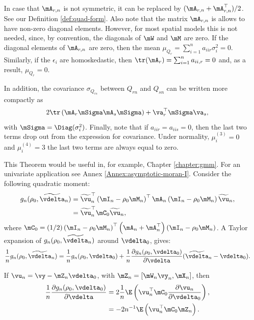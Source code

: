 \documentclass[english,12pt]{book}\usepackage[]{graphicx}\usepackage[]{xcolor}
\begin{document}
In case that $\mA_{r,n}$ is not symmetric, it can be replaced by $(\mA_{r, n}+ \mA_{r, n}^\top)/2$. See our Definition \ref{def:quad-form}. Also note that the matrix $\mA_{r,n}$ is allows to have non-zero diagonal elements. However, for most spatial models this is not needed, since, by convention, the diagonals of $\mW$ and $\mM$ are zero. If the diagonal elements of $\mA_{r,n}$ are zero, then the mean $\mu_{Q_r}  = \sum_{i = 1}^na_{iir}\sigma_i^2 = 0$. Similarly, if the $\epsilon_i$ are homoskedastic, then $\tr(\mA_r) = \sum_{i = 1}^n a_{ii,r} = 0$ and, as a result, $\mu_{Q_r} = 0$. 

In addition, the covariance $\sigma_{Q_{rs}}$ between $Q_{rn}$ and $Q_{sn}$ can be written more compactly as
\begin{equation*}
2\tr\left(\mA_r\mSigma\mA_s\mSigma\right) + \va_r^\top\mSigma\va_s,
\end{equation*}
%
with $\mSigma = \Diag(\sigma_i^2)$. Finally, note that if $a_{iir} = a_{iis} = 0$, then the last two terms drop out from the expression for covariance. Under normality, $\mu_i^{(3)} = 0$ and $\mu_{i}^{(4)} = 3$ the last two terms are always equal to zero. 

This Theorem would be useful in, for example, Chapter \ref{chapter:gmm}. For an univariate application see Annex \ref{Annex:asymptotic-moran-I}. Consider the following quadratic moment:
\begin{equation*}
\begin{aligned}
g_n(\rho_0, \widetilde{\vdelta}_n) & = \widetilde{\vu}_n^\top\left(\mI_n - \rho_0\mM_n\right)^\top\mA_n\left(\mI_n - \rho_0\mM_n\right)\widetilde{\vu}_n, \\
                                  & = \widetilde{\vu}_n^\top\mC_0\widetilde{\vu}_n, 
\end{aligned}
\end{equation*}
%
where $\mC_0 = (1 / 2)\left(\mI_n - \rho_0\mM_n\right)^\top\left(\mA_n + \mA_n^\top\right)\left(\mI_n - \rho_0\mM_n\right)$. A Taylor expansion of $g_n(\rho_0, \widetilde{\vdelta}_n)$ around $\vdelta_0$, gives:
\begin{equation*}
  \frac{1}{n}g_n(\rho_0, \widetilde{\vdelta}_n) = \frac{1}{n}g_n(\rho_0, \vdelta_0) + \frac{1}{n}\frac{\partial g_n(\rho_0, \vdelta_0)}{\partial \vdelta}(\widetilde{\vdelta}_n - \vdelta_0).
\end{equation*}

If $\vu_n = \vy - \mZ_n\vdelta_0$, with $\mZ_n = \left[\mW_n\vy_n, \mX_n\right]$, then
\begin{equation*}
\begin{aligned}
\frac{1}{n}\frac{\partial g_n(\rho_0, \vdelta_0)}{\partial \vdelta} & = 2\frac{1}{n}\E\left(\vu_n^\top\mC_0\frac{\partial \vu_n}{\partial \vdelta_0}\right), \\
& = - 2n^{-1}\E\left(\vu_n^\top\mC_0\mZ_n\right).
\end{aligned}
\end{equation*}
\end{document}
